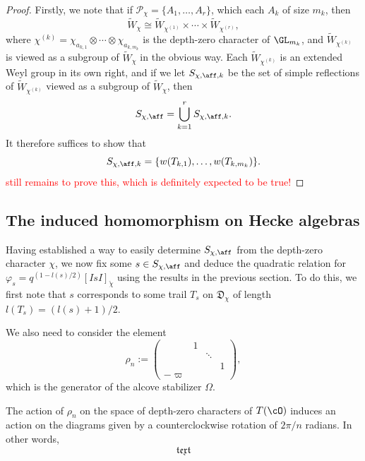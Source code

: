     \begin{proof}
        Firstly, we note that if $\mathcal{P}_\chi=\{A_1,\ldots,A_r\}$, which each $A_k$ of size $m_k$, then 
        $$\widetilde{W}_\chi\cong \widetilde{W}_{\chi^{(1)}}\times\cdots\times\widetilde{W}_{\chi^{(r)}},$$
        where $\chi^{(k)}=\chi_{a_{k,1}}\otimes\cdots\otimes\chi_{a_{k,m_k}}$ is the depth-zero character of $\GL_{m_k}$, and $\widetilde{W}_{\chi^{(k)}}$ is viewed as a subgroup of $\widetilde{W}_{\chi}$ in the obvious way. Each $\widetilde{W}_{\chi^{(k)}}$ is an extended Weyl group in its own right, and if we let $S_{\chi,\aff,k}$ be the set of simple reflections of $\widetilde{W}_{\chi^{(k)}}$ viewed as a subgroup of $\widetilde{W}_{\chi}$, then 
        $$S_{\chi,\aff}=\bigcup_{k=1}^r S_{\chi,\aff,k}.$$
        It therefore suffices to show that 
        $$S_{\chi,\aff,k}=\{w(T_{k,1}),\ldots,w(T_{k,m_k})\}.$$
        \textcolor{red}{still remains to prove this, which is definitely expected to be true!}
    \end{proof}
        
    \subsection{The induced homomorphism on Hecke algebras}

    Having established a way to easily determine $S_{\chi,\aff}$ from the depth-zero character $\chi$, we now fix some $s\in S_{\chi,\aff}$ and deduce the quadratic relation for $\varphi_s=q^{(1-l(s)/2)}[IsI]_{\check{\chi}}$ using the results in the previous section. To do this, we first note that $s$ corresponds to some trail $T_s$ on $\mathfrak{D}_\chi$ of length $l(T_s)=(l(s)+1)/2$. 

    We also need to consider the element 
    \begin{equation*}
        \rho_n:=
        \begin{pmatrix}
            &1&& \\
            &&\ddots& \\
            &&&1 \\
            -\varpi&&& 
        \end{pmatrix},
    \end{equation*}
    which is the generator of the alcove stabilizer $\Omega$.

    \begin{lemma}
        The action of $\rho_n$ on the space of depth-zero characters of $T(\cO)$ induces an action on the diagrams given by a counterclockwise rotation of $2\pi/n$ radians. In other words, 
        $$\mathfrak{text}$$
    \end{lemma}
